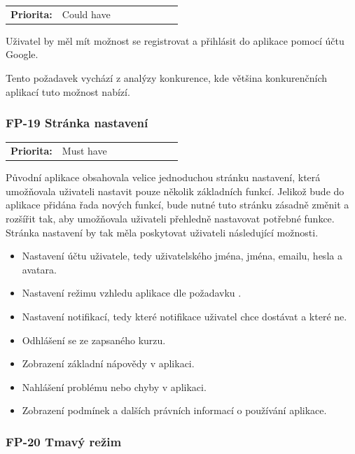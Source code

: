 \begin{tabular}{lp{0.7\linewidth}}
    \textbf{Priorita:} & Could have \\
\end{tabular}

Uživatel by měl mít možnost se registrovat a přihlásit do aplikace pomocí účtu Google. 

Tento požadavek vychází z analýzy konkurence, kde většina konkurenčních aplikací tuto možnost nabízí.

\subsubsection{FP-19 Stránka nastavení}\label{sec:fp-settings-page}

\begin{tabular}{lp{0.7\linewidth}}
    \textbf{Priorita:} & Must have \\
\end{tabular}

Původní aplikace obsahovala velice jednoduchou stránku nastavení, která umožňovala uživateli nastavit pouze několik základních funkcí. Jelikož bude do aplikace přidána řada nových funkcí, bude nutné tuto stránku zásadně změnit a rozšířit tak, aby umožňovala uživateli přehledně nastavovat potřebné funkce. Stránka nastavení by tak měla poskytovat uživateli následující možnosti.

\begin{itemize}
    \item Nastavení účtu uživatele, tedy uživatelského jména, jména, emailu, hesla a avatara.
    \item Nastavení režimu vzhledu aplikace dle požadavku .
    \item Nastavení notifikací, tedy které notifikace uživatel chce dostávat a které ne.
    \item Odhlášení se ze zapsaného kurzu.
    \item Zobrazení základní nápovědy v aplikaci.
    \item Nahlášení problému nebo chyby v aplikaci.
    \item Zobrazení podmínek a dalších právních informací o používání aplikace.
\end{itemize}

\subsubsection{FP-20 Tmavý režim}\label{sec:fp-dark-mode}

